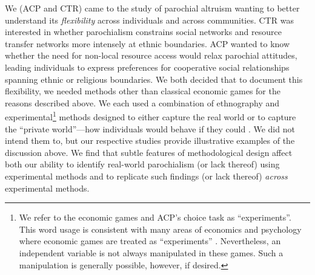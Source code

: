 \documentclass[bibauthoryear]{aa}
\begin{document}
We (ACP and CTR) came to the study of parochial altruism wanting to better understand its \textit{flexibility} across individuals and across communities. CTR was interested in whether parochialism constrains social networks and resource transfer networks more intensely at ethnic boundaries. ACP wanted to know whether the need for non-local resource access would relax parochial attitudes, leading individuals to express preferences for cooperative social relationships spanning ethnic or religious boundaries. We both decided that to document this flexibility, we needed methods other than classical economic games for the reasons described above. We each used a combination of ethnography and experimental\footnote{We refer to the economic games and ACP's choice task as ``experiments''. This word usage is consistent with many areas of economics and psychology where economic games are treated as ``experiments'' \citep{guala2005methodology, Cattell1988}. Nevertheless, an independent variable is  not always manipulated in these games.  Such a manipulation is generally possible, however, if desired.} methods designed to either capture the real world  or to capture the ``private world''---how individuals would behave if they could \citep{Pisor2020}. We did not intend them to, but our respective studies provide illustrative examples of the discussion above. We find that subtle features of methodological design affect both our ability to identify real-world parochialism (or lack thereof) using experimental methods and to replicate such findings (or lack thereof) \textit{across} experimental methods.  %
\end{document}
